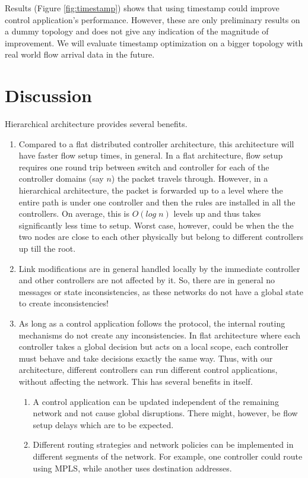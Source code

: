 \documentclass[10pt, twocolumn]{article}
\begin{document}
Results (Figure \ref{fig:timestamp}) shows that using timestamp could improve control application's performance. However, these are only preliminary results on a dummy topology and does not give any indication of the magnitude of improvement. We will evaluate timestamp optimization on a bigger topology with real world flow arrival data in the future. 

\section{Discussion}
\label{sec:discuss}
Hierarchical architecture provides several benefits.
\begin{enumerate}
    \item Compared to a flat distributed controller architecture, this architecture will have faster flow setup times, in general. In a flat architecture, flow setup requires one round trip between switch and controller for each of the controller domains (say $n$) the packet travels through. However, in a hierarchical architecture, the packet is forwarded up to a level where the entire path is under one controller and then the rules are installed in all the controllers. On average, this is $O(log\;n)$ levels up and thus takes significantly less time to setup. Worst case, however, could be when the the two nodes are close to each other physically but belong to different controllers up till the root.
    \item Link modifications are in general handled locally by the immediate controller and other controllers are not affected by it. So, there are in general no messages or state inconsistencies, as these networks do not have a global state to create inconsistencies!
    \item As long as a control application follows the protocol, the internal routing mechanisms do not create any inconsistencies. In flat architecture where each controller takes a global decision but acts on a local scope, each controller must behave and take decisions exactly the same way. Thus, with our architecture, different controllers can run different control applications, without affecting the network. This has several benefits in itself.
        \begin{enumerate}
            \item A control application can be updated independent of the remaining network and not cause global disruptions. There might, however, be flow setup delays which are to be expected.
            \item Different routing strategies and network policies can be implemented in different segments of the network. For example, one controller could route using MPLS, while another uses destination addresses.

\end{enumerate}
\end{enumerate}
\end{document}
